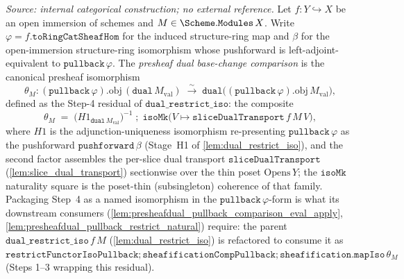 \begin{definition}\leanok
  \label{def:presheafdual_pullback_comparison}
  \textit{Source: internal categorical construction; no external reference.}
  Let \(f : Y \hookrightarrow X\) be an open immersion of schemes and
  \(M \in \Scheme.\mathtt{Modules}\,X\). Write \(\varphi = f.\mathtt{toRingCatSheafHom}\) for the
  induced structure-ring map and \(\beta\) for the open-immersion structure-ring isomorphism whose
  pushforward is left-adjoint-equivalent to \(\mathtt{pullback}\,\varphi\). The \emph{presheaf dual
  base-change comparison} is the canonical presheaf isomorphism
  \[
    \theta_M : (\mathtt{pullback}\,\varphi).\mathrm{obj}\,(\mathtt{dual}\,M_{\mathrm{val}})
      \;\xrightarrow{\ \sim\ }\;
      \mathtt{dual}\bigl((\mathtt{pullback}\,\varphi).\mathrm{obj}\,M_{\mathrm{val}}\bigr),
  \]
  defined as the Step-4 residual of \(\mathtt{dual\_restrict\_iso}\): the composite
  \[
    \theta_M \;=\; \bigl(H1_{\mathtt{dual}\,M_{\mathrm{val}}}\bigr)^{-1}
      \;\mathbin{;}\; \mathtt{isoMk}\bigl(V \mapsto \mathtt{sliceDualTransport}\,f\,M\,V\bigr),
  \]
  where \(H1\) is the adjunction-uniqueness isomorphism re-presenting \(\mathtt{pullback}\,\varphi\) as
  the pushforward \(\mathtt{pushforward}\,\beta\) (Stage~H1 of \cref{lem:dual_restrict_iso}), and the
  second factor assembles the per-slice dual transport \(\mathtt{sliceDualTransport}\)
  (\cref{lem:slice_dual_transport}) sectionwise over the thin poset \(\mathrm{Opens}\,Y\); the
  \(\mathtt{isoMk}\) naturality square is the poset-thin (subsingleton) coherence of that family.
  Packaging Step~4 as a named isomorphism in the \(\mathtt{pullback}\,\varphi\)-form is what its
  downstream consumers (\cref{lem:presheafdual_pullback_comparison_eval_apply},
  \cref{lem:presheafdual_pullback_restrict_natural}) require: the parent
  \(\mathtt{dual\_restrict\_iso}\,f\,M\) (\cref{lem:dual_restrict_iso}) is refactored to consume it as
  \(\mathtt{restrictFunctorIsoPullback} \mathbin{;} \mathtt{sheafificationCompPullback}
  \mathbin{;} \mathtt{sheafification.mapIso}\,\theta_M\) (Steps 1--3 wrapping this residual).
\end{definition}

